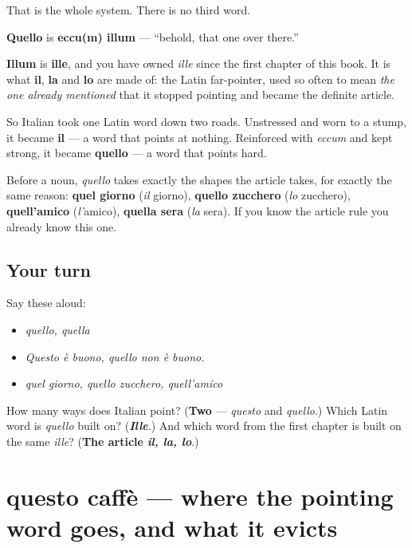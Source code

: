 That is the whole system. There is no third word.

\begin{cousinweb}
\textbf{Quello} is \textbf{eccu(m) illum} — \textquotedblleft{}behold, that one over there.\textquotedblright{}

\textbf{Illum} is \textbf{ille}, and you have owned \emph{ille} since the first chapter of this book. It is what \textbf{il}, \textbf{la} and \textbf{lo} are made of: the Latin far-pointer, used so often to mean \emph{the one already mentioned} that it stopped pointing and became the definite article.

So Italian took one Latin word down two roads. Unstressed and worn to a stump, it became \textbf{il} — a word that points at nothing. Reinforced with \emph{eccum} and kept strong, it became \textbf{quello} — a word that points hard.

Before a noun, \emph{quello} takes exactly the shapes the article takes, for exactly the same reason: \textbf{quel giorno} (\emph{il} giorno), \textbf{quello zucchero} (\emph{lo} zucchero), \textbf{quell'amico} (\emph{l'}amico), \textbf{quella sera} (\emph{la} sera). If you know the article rule you already know this one.
\end{cousinweb}

\subsection*{Your turn}
Say these aloud:

\begin{itemize}
\raggedright
  \item \emph{quello, quella}
  \item \emph{Questo è buono, quello non è buono.}
  \item \emph{quel giorno, quello zucchero, quell'amico}
\end{itemize}

\begin{tcolorbox}[breakable,colback=teal!4,colframe=teal!35!black,title={Before you move on}]
How many ways does Italian point? (\textbf{Two} — \emph{questo} and \emph{quello}.) Which Latin word is \emph{quello} built on? (\emph{\textbf{Ille}}.) And which word from the first chapter is built on the same \emph{ille}? (\textbf{The article} \emph{\textbf{il, la, lo}}.)
\end{tcolorbox}
\section[questo caffè]{questo caffè — where the pointing word goes, and what it evicts}

